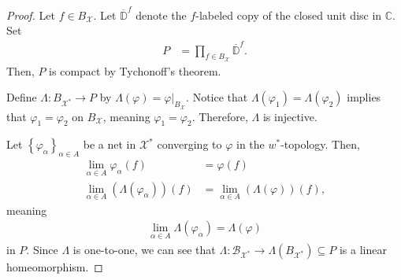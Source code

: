 \documentclass[10pt]{extarticle}
\newcommand{\C}{\mathbb{C}}
\newcommand{\set}[1]{\left\{#1\right\}}
\theoremstyle{plain}
\theoremstyle{definition}
\theoremstyle{note}
\renewcommand{\newline}{\hfill\break}
\begin{document}
\begin{proof}
  Let $f\in B_{\mathcal{X}}$. Let $\overline{\mathbb{D}}^{f}$ denote the $f$-labeled copy of the closed unit disc in $\C$. Set
  \begin{align*}
    P &= \prod_{f\in B_{\mathcal{X}}}\overline{\mathbb{D}}^{f}.
  \end{align*}
  Then, $P$ is compact by Tychonoff's theorem.\newline

  Define $\Lambda: B_{\mathcal{X}^{\ast}} \rightarrow P$ by $\Lambda(\varphi) = \varphi\vert_{B_{\mathcal{X}}}$. Notice that $\Lambda(\varphi_1) = \Lambda(\varphi_2)$ implies that $\varphi_1 = \varphi_2$ on $B_{\mathcal{X}}$, meaning $\varphi_1 = \varphi_2$. Therefore, $\Lambda$ is injective.\newline

  Let $\set{\varphi_{\alpha}}_{\alpha \in A}$ be a net in $\mathcal{X}^{\ast}$ converging to $\varphi$ in the $w^{\ast}$-topology. Then,
  \begin{align*}
    \lim_{\alpha \in A}\varphi_{\alpha}(f) &= \varphi(f)\\
    \lim_{\alpha \in A}\left(\Lambda\left(\varphi_{\alpha}\right)\right)(f) &= \lim_{\alpha \in A}\left(\Lambda\left(\varphi\right)\right)(f),
  \end{align*}
  meaning
  \begin{align*}
    \lim_{\alpha \in A}\Lambda\left(\varphi_{\alpha}\right) = \Lambda\left(\varphi\right)
  \end{align*}
  in $P$. Since $\Lambda$ is one-to-one, we can see that $\Lambda: \mathcal{B}_{\mathcal{X}^{\ast}} \rightarrow \Lambda\left(B_{\mathcal{X}^{\ast}}\right)\subseteq P$ is a linear homeomorphism.\newline


\end{proof}
\end{document}
